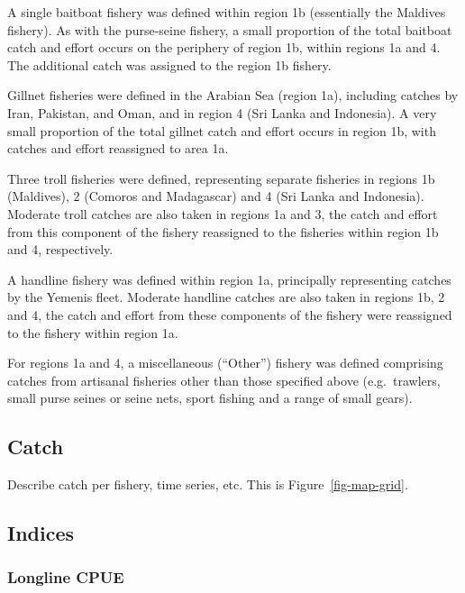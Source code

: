 \documentclass[
]{scrartcl}
\begin{document}
A single baitboat fishery was defined within region 1b (essentially the
Maldives fishery). As with the purse-seine fishery, a small proportion
of the total baitboat catch and effort occurs on the periphery of region
1b, within regions 1a and 4. The additional catch was assigned to the
region 1b fishery.

Gillnet fisheries were defined in the Arabian Sea (region 1a), including
catches by Iran, Pakistan, and Oman, and in region 4 (Sri Lanka and
Indonesia). A very small proportion of the total gillnet catch and
effort occurs in region 1b, with catches and effort reassigned to area
1a.

Three troll fisheries were defined, representing separate fisheries in
regions 1b (Maldives), 2 (Comoros and Madagascar) and 4 (Sri Lanka and
Indonesia). Moderate troll catches are also taken in regions 1a and 3,
the catch and effort from this component of the fishery reassigned to
the fisheries within region 1b and 4, respectively.

A handline fishery was defined within region 1a, principally
representing catches by the Yemenis fleet. Moderate handline catches are
also taken in regions 1b, 2 and 4, the catch and effort from these
components of the fishery were reassigned to the fishery within region
1a.

For regions 1a and 4, a miscellaneous (``Other'') fishery was defined
comprising catches from artisanal fisheries other than those specified
above (e.g.~trawlers, small purse seines or seine nets, sport fishing
and a range of small gears).

\subsection{Catch}\label{catch}

Describe catch per fishery, time series, etc. This is
Figure~\ref{fig-map-grid}.

\subsection{Indices}\label{indices}

\subsubsection{Longline CPUE}\label{longline-cpue}
\end{document}
